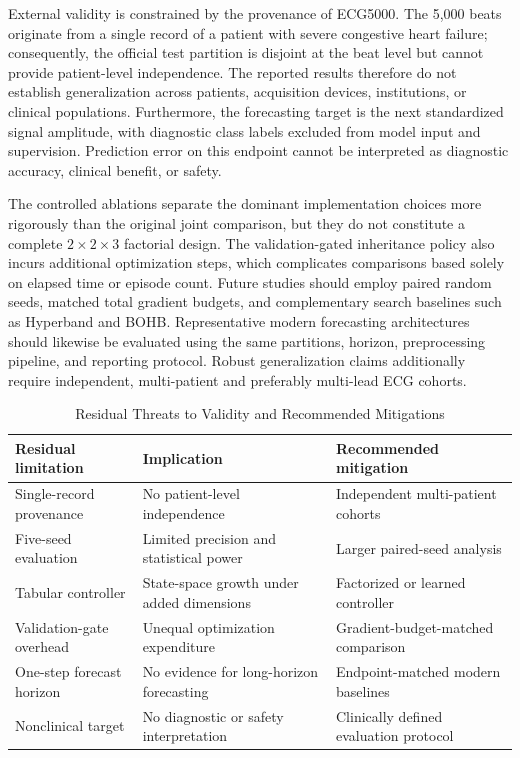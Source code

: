 \documentclass[conference]{IEEEtran}
\begin{document}
External validity is constrained by the provenance of ECG5000. The 5,000 beats originate from a single record of a patient with severe congestive heart failure; consequently, the official test partition is disjoint at the beat level but cannot provide patient-level independence. The reported results therefore do not establish generalization across patients, acquisition devices, institutions, or clinical populations. Furthermore, the forecasting target is the next standardized signal amplitude, with diagnostic class labels excluded from model input and supervision. Prediction error on this endpoint cannot be interpreted as diagnostic accuracy, clinical benefit, or safety.

The controlled ablations separate the dominant implementation choices more rigorously than the original joint comparison, but they do not constitute a complete $2\times2\times3$ factorial design. The validation-gated inheritance policy also incurs additional optimization steps, which complicates comparisons based solely on elapsed time or episode count. Future studies should employ paired random seeds, matched total gradient budgets, and complementary search baselines such as Hyperband and BOHB. Representative modern forecasting architectures \cite{nie2023patchtst,wu2023timesnet,zeng2023dlinear,luo2024moderntcn} should likewise be evaluated using the same partitions, horizon, preprocessing pipeline, and reporting protocol. Robust generalization claims additionally require independent, multi-patient and preferably multi-lead ECG cohorts.

\begin{table}[t]
\caption{Residual Threats to Validity and Recommended Mitigations}
\label{tab:validity}
\centering
\scriptsize
\begin{tabular}{@{}>{\raggedright\arraybackslash}p{}>{\raggedright\arraybackslash}p{}>{\raggedright\arraybackslash}p{}@{}}
\toprule
Residual limitation & Implication & Recommended mitigation \\
\midrule
Single-record provenance & No patient-level independence & Independent multi-patient cohorts \\
Five-seed evaluation & Limited precision and statistical power & Larger paired-seed analysis \\
Tabular controller & State-space growth under added dimensions & Factorized or learned controller \\
Validation-gate overhead & Unequal optimization expenditure & Gradient-budget-matched comparison \\
One-step forecast horizon & No evidence for long-horizon forecasting & Endpoint-matched modern baselines \\
Nonclinical target & No diagnostic or safety interpretation & Clinically defined evaluation protocol \\
\bottomrule
\end{tabular}
\end{table}
\end{document}
